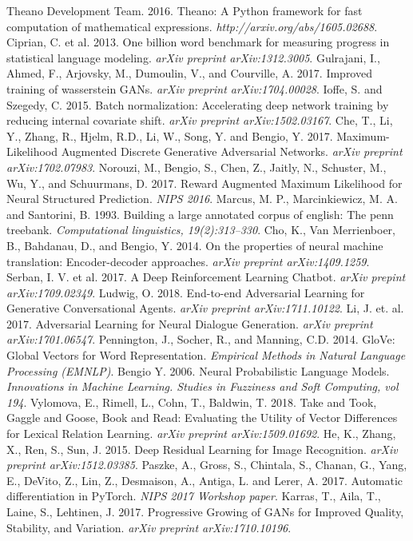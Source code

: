 \documentclass[a4paper,conference]{IEEEtran}
\begin{document}
\begin{thebibliography}{99}
 Theano Development Team. 2016. Theano: A Python framework for fast computation of mathematical expressions. \textit{http://arxiv.org/abs/1605.02688}.
 Ciprian, C. et al. 2013. One billion word benchmark for measuring progress in statistical language modeling. \textit{arXiv preprint arXiv:1312.3005}.
 Gulrajani, I., Ahmed, F., Arjovsky, M., Dumoulin, V., and Courville, A. 2017. Improved training of wasserstein GANs. \textit{arXiv preprint arXiv:1704.00028}.
 Ioffe, S. and Szegedy, C. 2015. Batch normalization: Accelerating deep network training by reducing internal covariate shift. \textit{arXiv preprint arXiv:1502.03167}.
 Che, T., Li, Y., Zhang, R., Hjelm, R.D., Li, W., Song, Y. and Bengio, Y. 2017. Maximum-Likelihood Augmented Discrete Generative Adversarial Networks. \textit{arXiv preprint arXiv:1702.07983}.
 Norouzi, M., Bengio, S., Chen, Z., Jaitly, N., Schuster, M., Wu, Y., and Schuurmans, D. 2017. Reward Augmented Maximum Likelihood for Neural Structured Prediction. \textit{NIPS 2016}.
 Marcus, M. P., Marcinkiewicz, M. A. and Santorini, B. 1993. Building a large annotated corpus of english: The penn treebank. \textit{Computational linguistics, 19(2):313–330}.
 Cho, K., Van Merrienboer, B., Bahdanau, D., and Bengio, Y. 2014. On the properties of neural machine translation: Encoder-decoder approaches.
\textit{arXiv preprint arXiv:1409.1259}.
 Serban, I. V. et al. 2017. A Deep Reinforcement Learning Chatbot. \textit{arXiv prepint arXiv:1709.02349}.
 Ludwig, O. 2018. End-to-end Adversarial Learning for Generative Conversational Agents. \textit{arXiv preprint arXiv:1711.10122}.
 Li, J. et. al. 2017. Adversarial Learning for Neural Dialogue Generation. \textit{arXiv preprint arXiv:1701.06547}.
 Pennington, J., Socher, R., and Manning, C.D. 2014. GloVe: Global Vectors for Word Representation. \textit{Empirical Methods in Natural Language Processing (EMNLP)}.
 Bengio Y. 2006. Neural Probabilistic Language Models. \textit{Innovations in Machine Learning. Studies in Fuzziness and Soft Computing, vol 194}.
 Vylomova, E., Rimell, L., Cohn, T., Baldwin, T. 2018. Take and Took, Gaggle and Goose, Book and Read: Evaluating the Utility of Vector Differences for Lexical Relation Learning. \textit{arXiv preprint arXiv:1509.01692}.
 He, K., Zhang, X., Ren, S., Sun, J. 2015. Deep Residual Learning for Image Recognition. \textit{arXiv preprint arXiv:1512.03385}.
 Paszke, A., Gross, S., Chintala, S., Chanan, G., Yang, E., DeVito, Z., Lin, Z., Desmaison, A., Antiga, L. and Lerer, A. 2017. Automatic differentiation in PyTorch. \textit{NIPS 2017 Workshop paper}.
 Karras, T., Aila, T., Laine, S., Lehtinen, J. 2017. Progressive Growing of GANs for Improved Quality, Stability, and Variation. \textit{arXiv preprint arXiv:1710.10196}.

\end{thebibliography}




\end{document}
